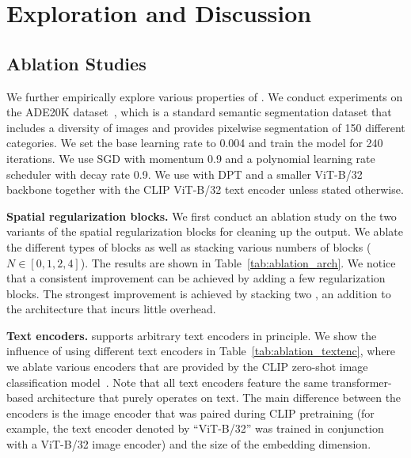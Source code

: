 \section{Exploration and Discussion}
\label{sec:discussion}
\subsection{Ablation Studies}
We further empirically explore various properties of \methodname{}. We conduct experiments  on the ADE20K dataset~\citep{zhou2019semantic}, which is a standard semantic segmentation dataset that includes a diversity of images and provides pixelwise segmentation of 150 different categories. 
We set the base learning rate to 0.004 and train the model for 240 iterations. We use SGD with momentum 0.9 and a polynomial learning rate scheduler with decay rate 0.9. We use \methodname{} with DPT and a smaller ViT-B/32 backbone together with the CLIP ViT-B/32 text encoder unless stated otherwise.


\textbf{Spatial regularization blocks.}
We first conduct an ablation study on the two variants of the spatial regularization blocks for cleaning up the output. 
We ablate the different types of blocks as well as stacking various numbers of blocks ($N \in [0, 1, 2, 4]$). The results are shown in Table~\ref{tab:ablation_arch}. We notice that a consistent improvement can be achieved by adding a few regularization blocks. The strongest improvement is achieved by stacking two , an addition to the architecture that incurs little overhead.



\begin{table}[b!]
    \centering
    
    \label{tab:ablation_arch}
\end{table}

\begin{table}[b!]
    \centering
    
    \label{tab:ablation_textenc}
\end{table}

\textbf{Text encoders.} 
\methodname{} supports arbitrary text encoders in principle. We show the influence of using different text encoders in Table~\ref{tab:ablation_textenc}, where we ablate various encoders that are provided by the CLIP zero-shot image classification model~\citep{radford2021learning}. Note that all text encoders feature the same transformer-based architecture that purely operates on text. The main difference
between the encoders is the image encoder that was paired during CLIP pretraining (for example, the text encoder denoted by ``ViT-B/32'' was trained in conjunction with a ViT-B/32 image encoder) and the size of the embedding dimension.


